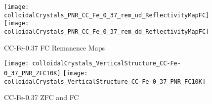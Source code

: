 \documentclass[\main/dresen_thesis.tex]{subfiles}
\begin{document}
  \label{sec:colloidalCrystals:layers:pnr}

  \begin{figure}[tb]
    \centering
    \texttt{[image: colloidalCrystals\_PNR\_CC\_Fe\_0\_37\_rem\_ud\_ReflectivityMapFC]}
    \texttt{[image: colloidalCrystals\_PNR\_CC\_Fe\_0\_37\_rem\_dd\_ReflectivityMapFC]}
    \caption{\label{fig:colloidalCrystals:pnr} CC-Fe-0.37 FC Remanence Maps}
  \end{figure}


  \begin{figure}[tb]
    \centering
    \texttt{[image: colloidalCrystals\_VerticalStructure\_CC-Fe-0\_37\_PNR\_ZFC10K]}
    \texttt{[image: colloidalCrystals\_VerticalStructure\_CC-Fe-0\_37\_PNR\_FC10K]}
    \caption{\label{fig:colloidalCrystals:pnr} CC-Fe-0.37 ZFC and FC}
  \end{figure}

  
  
\end{document}
